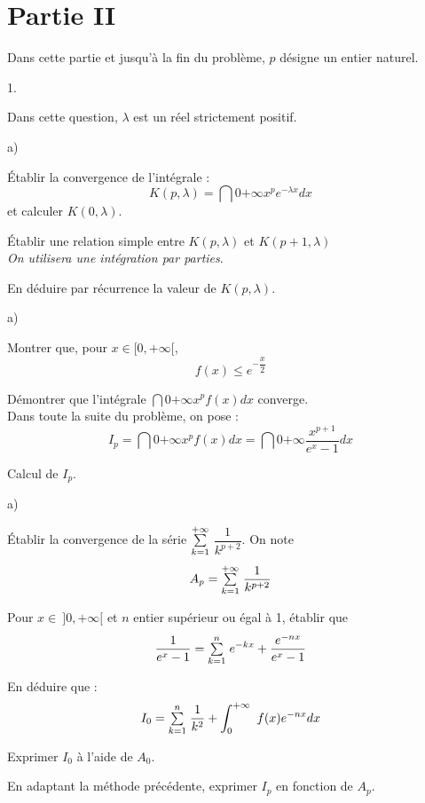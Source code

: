 \documentclass[11pt]{article}%
\begin{document}
\section*{Partie II}

Dans cette partie et jusqu'à la fin du problème, $p$ désigne un entier
naturel.

\begin{noliste}{1.}
 \setlength{\itemsep}{4mm}
\item Dans cette question, $\lambda $ est un réel strictement positif.

\begin{noliste}{a)}
 \setlength{\itemsep}{2mm}
\item Établir la convergence de l'intégrale :
\[
K(p,\lambda ) = \dint{0}{+ \infty }x^{p}e^{-\lambda x}dx
\]
et calculer $K(0,\lambda )$.

\item Établir une relation simple entre $K(p,\lambda )$ et $K(p +
1,\lambda )$\\
\textit{On utilisera une intégration par parties}.

\item En déduire par récurrence la valeur de $K(p,\lambda )$.
\end{noliste}

\item 

\begin{noliste}{a)}
 \setlength{\itemsep}{2mm}
\item Montrer que, pour $x\in \lbrack 0, + \infty \lbrack $, 
\[
f(x)\leq e^{-{\dfrac{x}{2}}}
\]

\item Démontrer que l'intégrale $\dint{0}{+ \infty }x^{p}f(x)dx$
converge.\\
Dans toute la suite du problème, on pose : 
\[
I_{p} = \dint{0}{+ \infty }x^{p}f(x)dx = \dint{0}{+ \infty
}{\dfrac{x^{p + 1}}{e^{x}-1}}dx
\]
\end{noliste}

\item Calcul de $I_{p}$.

\begin{noliste}{a)}
 \setlength{\itemsep}{2mm}
\item Établir la convergence de la série ${\textstyle\sum\limits_{k = 1}^{+ \infty
}}\hspace{.1cm}${$\dfrac{1}{k^{p + 2}}$}. On note 
\[
A_{p} = {\textstyle\sum\limits_{k = 1}^{+ \infty }}\hspace{.1cm}{\dfrac{1}{k^{p + 2}}}
\]

\item Pour $x\in \ ]0, + \infty \lbrack $ et $n$ entier supérieur ou
égal à 1, établir que 
\[
{\dfrac{1}{e^{x}-1}} = {\textstyle\sum\limits_{k = 1}^{n}}\hspace{.1cm}e^{-kx} +
{\dfrac{e^{-nx}}{e^{x}-1}}
\]

\item En déduire que : 
\[
I_{0} = {\textstyle\sum\limits_{k = 1}^{n}}\hspace{.1cm}{\dfrac{1}{k^{2}}} + \displaystyle \int_{0}^{+ \infty
}\ f(x)e^{-nx}dx
\]

\item Exprimer $I_{0}$ à l'aide de $A_{0}$.

\item En adaptant la méthode précédente, exprimer $I_{p}$ en fonction
de $A_{p}$.
\end{noliste}
\end{noliste}
\end{document}

